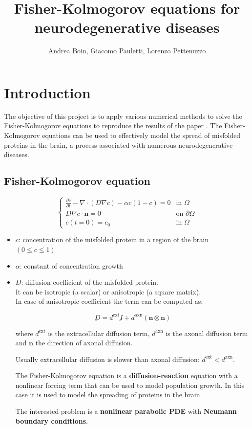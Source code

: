 \documentclass[12pt, letterpaper]{article}
\title{Fisher-Kolmogorov equations for neurodegenerative diseases}
\author{Andrea Boin, Giacomo Pauletti, Lorenzo Pettenuzzo}
\date{}
\begin{document}
\maketitle
\pagebreak

\tableofcontents
\pagebreak

\section{Introduction}
The objective of this project is to apply various numerical methods to solve the Fisher-Kolmogorov equations to reproduce the results of the paper \cite{diffusion-paper}. The Fisher-Kolmogorov equations can be used to effectively model the spread of misfolded proteins in the brain, a process associated with numerous neurodegenerative diseases.

\subsection{Fisher-Kolmogorov equation}
\[
\begin{cases}
\displaystyle \frac{\partial c}{\partial t} - \nabla \cdot (D \nabla c) - \alpha c(1 - c) = 0 & \text{in } \Omega\\
\displaystyle D \nabla c \cdot \mathbf{n} = 0 & \text{on } \partial \Omega\\
c(t=0)=c_0 & \text{in } \Omega
\end{cases}
\]
\begin{itemize}
    \item $c$: concentration of the misfolded protein in a region of the brain $(0\leq c\leq1)$
    \item $\alpha$: constant of concentration growth
    \item $D$: diffusion coefficient of the misfolded protein.\\
It can be isotropic (a scalar) or anisotropic (a square matrix).\\
In case of anisotropic coefficient the term can be computed as:

$$\underbar{D}=d^{\text{ext}}\underbar{I}+d^{\text{axn}}(\mathbf{n}\otimes\mathbf{n})$$

where $d^{\text{ext}}$ is the extracellular diffusion term, $d^{\text{axn}}$ is the axonal diffusion term and $\mathbf{n}$ the direction of axonal diffusion.

Usually extracellular diffusion is slower than axonal diffusion: $d^{\text{ext}}<d^{\text{axn}}$.

The Fisher-Kolmogorov equation is a \textbf{diffusion-reaction} equation with a nonlinear forcing term that can be used to model population growth. In this case it is used to model the spreading of proteins in the brain.

The interested problem is a \textbf{nonlinear parabolic PDE} with \textbf{Neumann boundary conditions}.
\end{itemize} 
\end{document}

